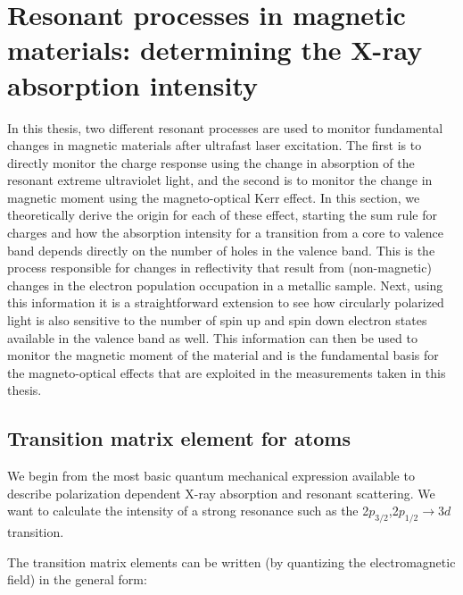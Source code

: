\section{Resonant processes in magnetic materials: determining the X-ray absorption intensity}

In this thesis, two different resonant processes are used to monitor fundamental changes in magnetic materials after ultrafast laser excitation. The first is to directly monitor the charge response using the change in absorption of the resonant extreme ultraviolet light, and the second is to monitor the change in magnetic moment using the magneto-optical Kerr effect. In this section, we theoretically derive the origin for each of these effect, starting the sum rule for charges and how the absorption intensity for a transition from a core to valence band depends directly on the number of holes in the valence band. This is the process responsible for changes in reflectivity that result from (non-magnetic) changes in the electron population occupation in a metallic sample. Next, using this information it is a straightforward extension to see how circularly polarized light is also sensitive to the number of spin up and spin down electron states available in the valence band as well. This information can then be used to monitor the magnetic moment of the material and is the fundamental basis for the magneto-optical effects that are exploited in the measurements taken in this thesis.

\subsection{Transition matrix element for atoms}

We begin from the most basic quantum mechanical expression available to describe polarization dependent X-ray absorption and resonant scattering. We want to calculate the intensity of a strong resonance such as the 2$p_{3/2}$,2$p_{1/2}\rightarrow3d$ transition.

The transition matrix elements can be written (by quantizing the electromagnetic field) in the general form:

